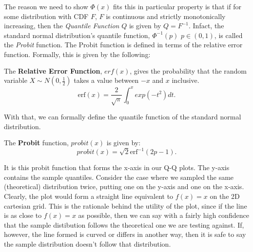 The reason we need to show $\Phi(x)$ fits this in particular property is that if for some distribution with CDF $F$, $F$ is continuous and strictly monotonically increasing, then 
the \textit{Quantile Function} $Q$ is given by $Q = F^{-1}$. Infact, the standard normal distribution's quantile function, $\Phi^{-1}(p)$ $p \in (0,1)$, is called the \textit{Probit}
function. The Probit function is defined in terms of the relative error function. Formally, this is given by the following:

\begin{definition}
    The \textbf{Relative Error Function}, $erf(x)$, gives the probability that the random variable $X \sim N(0,\frac{1}{2})$ takes a value between $-x$ and $x$ inclusive. 
    \[
        \text{erf}(x) = \frac{2}{\sqrt{\pi}}\int_0^x exp(-t^2)dt.    
    \]
\end{definition}

With that, we can formally define the quantile function of the standard normal distribution.

\begin{definition}
    The \textbf{Probit} function, $probit(x)$ is given by:
    \[
        probit(x) = \sqrt{2}\text{erf}^{-1}(2p-1).  
    \]
\end{definition}

It is this probit function that forms the x-axis in our Q-Q plots. The y-axis contains the sample quantiles. Consider the case where we sampled the same (theoretical) distribution twice,
putting one on the y-axis and one on the x-axis. Clearly, the plot would form a straight line equivalent to $f(x)=x$ on the 2D cartesian grid. This is the rationale behind the utility of the plot, since 
if the line is as close to $f(x)=x$ as possible, then we can say with a fairly high confidence that the sample distibution follows the theoretical one we are testing against. If, however, the line formed is curved or differs in another way, then it is safe to say the sample distribution doesn't follow that distribution. 